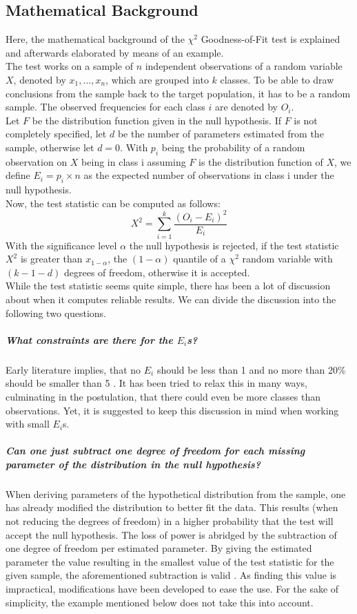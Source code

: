 \documentclass{article}
\theoremstyle{definition}
\begin{document}
\subsection{Mathematical Background}
Here, the mathematical background of the $\chi^2$ Goodness-of-Fit test is explained and afterwards elaborated by means of an example.
\\
The test works on a sample of $n$ independent observations of a random variable $X$, denoted by $x_1, \ldots, x_n$, which are grouped into $k$ classes.
To be able to draw conclusions from the sample back to the target population, it has to be a random sample.
The observed frequencies for each class $i$ are denoted by $O_i$.
\\
Let $F$ be the distribution function given in the null hypothesis.
If $F$ is not completely specified, let $d$ be the number of parameters estimated from the sample, otherwise let $d=0$.
With $p_i$ being the probability of a random observation on $X$ being in class i assuming $F$ is the distribution function of $X$, we define $E_i = p_i \times n$ as the expected number of observations in class i under the null hypothesis.
\\
Now, the test statistic can be computed as follows:
\begin{equation}
	\label{eq:chisq}
	X^2 = \sum_{i=1}^{k}\frac{(O_i - E_i)^2}{E_i}
\end{equation}
With the significance level $\alpha$ the null hypothesis is rejected, if the test statistic $X^2$ is greater than $x_{1-\alpha}$, the $(1-\alpha)$ quantile of a $\chi^2$ random variable with $(k-1-d)$ degrees of freedom, otherwise it is accepted.
\\
While the test statistic seems quite simple, there has been a lot of discussion about when it computes reliable results.
We can divide the discussion into the following two questions.
\subparagraph{What constraints are there for the $E_i$s?}
	Early literature implies, that no $E_i$ should be less than 1 and no more than 20\% should be smaller than 5 \cite{conover1980practical}.
	It has been tried to relax this in many ways, culminating in the postulation, that there could even be more classes than observations.
	Yet, it is suggested to keep this discussion in mind when working with small $E_i$s.
\subparagraph{Can one just subtract one degree of freedom for each missing parameter of the distribution in the null hypothesis?}
	When deriving parameters of the hypothetical distribution from the sample, one has already modified the distribution to better fit the data.
	This results (when not reducing the degrees of freedom) in a higher probability that the test will accept the null hypothesis.
	The loss of power is abridged by the subtraction of one degree of freedom per estimated parameter.
	By giving the estimated parameter the value resulting in the smallest value of the test statistic for the given sample, the aforementioned subtraction is valid \cite{conover1980practical}.
	As finding this value is impractical, modifications have been developed to ease the use.
	For the sake of simplicity, the example mentioned below does not take this into account.
\end{document}
